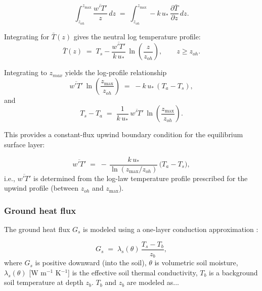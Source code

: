 \documentclass{article}
\begin{document}
    
    \begin{equation}
    \int_{z_{oh}}^{z_{\max}}\frac{\overline{w'T'}}{z}\,dz
    \;=\;
    \int_{z_{oh}}^{z_{\max}} -k\,u_*\,\frac{\partial \bar T}{\partial z}\,dz .
    \end{equation}
    
    Integrating for $\bar T(z)$ gives the neutral log temperature profile:
    \begin{equation}
    \bar T(z)
    \;=\;
    T_s
    -\frac{\overline{w'T'}}{k\,u_*}\,
    \ln\!\left(\frac{z}{z_{oh}}\right),
    \qquad z\ge z_{oh}.
    \label{eq:T_log_profile}
    \end{equation}
    
    Integrating to $z_{max}$ yields the log-profile relationship
    \begin{equation}
    \overline{w'T'} \,\ln\!\left(\frac{z_{\max}}{z_{oh}}\right)
    \;=\;
    -k\,u_*\,(T_a - T_s),
    \end{equation}
    and
    \begin{equation}
    T_s - T_a
    \;=\;
    \frac{1}{k\,u_*}\,\overline{w'T'}\,
    \ln\!\left(\frac{z_{\max}}{z_{oh}}\right).
    \label{eq:Ts_minus_Ta}
    \end{equation}
    

This provides a constant-flux upwind boundary condition for the equilibrium surface layer:

\begin{equation}
\overline{w'T'} \;=\; -\,\frac{k\,u_*}{\ln(z_{\max}/z_{oh})}\,\big(T_a - T_s\big),
\end{equation}
i.e., $\overline{w'T'}$ is determined from the log-law temperature profile prescribed for the upwind profile (between $z_{oh}$ and $z_{\max}$).
    
    
\subsubsection{Ground heat flux}  
    
    The ground heat flux $G_s$ is modeled using a one-layer conduction approximation \cite{xiong2023new}:
    
    \begin{equation}
    \label{eq:Gs_conduction}
    G_s \;=\; \lambda_s(\theta)\,\frac{T_s - T_b}{z_b},
    \end{equation}
    where $G_s$ is positive downward (into the soil), 
    $\theta$ is volumetric soil moisture, 
    $\lambda_s(\theta)$ [W m$^{-1}$ K$^{-1}$] is the effective soil thermal conductivity, 
    $T_b$ is a background soil temperature at depth $z_b$. 
    $T_b$ and $z_b$ are modeled as... 
    
\end{document}
